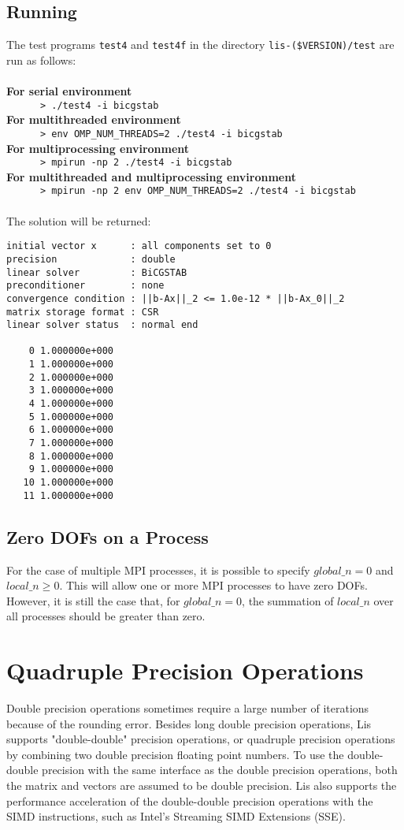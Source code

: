 \documentclass[a4paper]{article}
\begin{document}
\subsection{Running}
The test programs \verb|test4| and \verb|test4f| 
in the directory \verb|lis-($VERSION)/test| are run as follows: \\\\
{\bf For serial environment}\\
\verb+      > ./test4 -i bicgstab+\\
{\bf For multithreaded environment}\\
\verb+      > env OMP_NUM_THREADS=2 ./test4 -i bicgstab +\\
{\bf For multiprocessing environment}\\
\verb+      > mpirun -np 2 ./test4 -i bicgstab +\\
{\bf For multithreaded and multiprocessing environment}\\
\verb+      > mpirun -np 2 env OMP_NUM_THREADS=2 ./test4 -i bicgstab +\\\\
The solution will be returned:

\begin{verbatim}
initial vector x      : all components set to 0
precision             : double
linear solver         : BiCGSTAB
preconditioner        : none
convergence condition : ||b-Ax||_2 <= 1.0e-12 * ||b-Ax_0||_2
matrix storage format : CSR
linear solver status  : normal end

    0 1.000000e+000
    1 1.000000e+000
    2 1.000000e+000
    3 1.000000e+000
    4 1.000000e+000
    5 1.000000e+000
    6 1.000000e+000
    7 1.000000e+000
    8 1.000000e+000
    9 1.000000e+000
   10 1.000000e+000
   11 1.000000e+000
\end{verbatim}

\subsection{Zero DOFs on a Process}
For the case of multiple MPI processes, it is possible to specify
$global\_n = 0$ and $local\_n \ge 0$. This will allow one or more
MPI processes to have zero DOFs. However, it is still the case that,
for $global\_n = 0$, the summation of $local\_n$ over all processes
should be greater than zero. 

\newpage
\section{Quadruple Precision Operations}
\label{sec:quadruple}
\indent
Double precision operations sometimes require a large number of iterations 
because of the rounding error. Besides long double precision operations,
Lis supports "double-double" precision operations, 
or quadruple precision operations by combining 
two double precision floating point numbers\cite{dd,qd}.
To use the double-double precision with the same interface 
as the double precision operations, 
both the matrix and vectors are assumed to be double precision. 
Lis also supports the performance acceleration of the double-double precision
operations with the SIMD instructions, such as
Intel's Streaming SIMD Extensions (SSE)\cite{quadlis}. 
\end{document}
